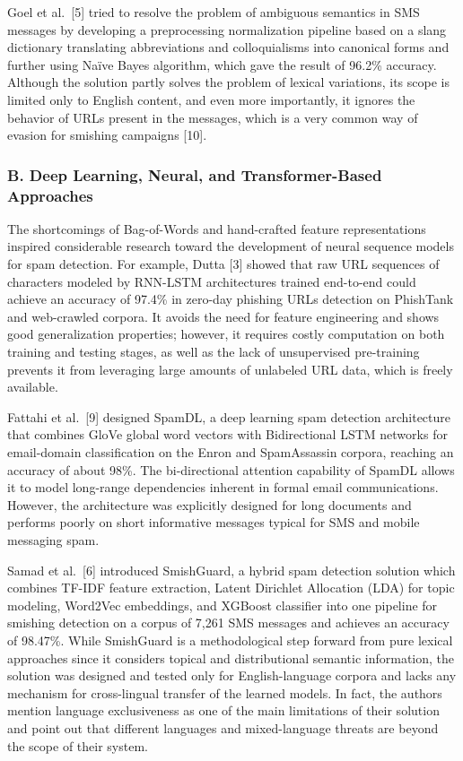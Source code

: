 Goel et al.~{[}5{]} tried to resolve the problem of ambiguous semantics
in SMS messages by developing a preprocessing normalization pipeline
based on a slang dictionary translating abbreviations and colloquialisms
into canonical forms and further using Naïve Bayes algorithm, which gave
the result of 96.2\% accuracy. Although the solution partly solves the
problem of lexical variations, its scope is limited only to English
content, and even more importantly, it ignores the behavior of URLs
present in the messages, which is a very common way of evasion for
smishing campaigns {[}10{]}.

\subsubsection{B. Deep Learning, Neural, and Transformer-Based
Approaches}\label{b.-deep-learning-neural-and-transformer-based-approaches}

The shortcomings of Bag-of-Words and hand-crafted feature
representations inspired considerable research toward the development of
neural sequence models for spam detection. For example, Dutta {[}3{]}
showed that raw URL sequences of characters modeled by RNN-LSTM
architectures trained end-to-end could achieve an accuracy of 97.4\% in
zero-day phishing URLs detection on PhishTank and web-crawled corpora.
It avoids the need for feature engineering and shows good generalization
properties; however, it requires costly computation on both training and
testing stages, as well as the lack of unsupervised pre-training
prevents it from leveraging large amounts of unlabeled URL data, which
is freely available.

Fattahi et al.~{[}9{]} designed SpamDL, a deep learning spam detection
architecture that combines GloVe global word vectors with Bidirectional
LSTM networks for email-domain classification on the Enron and
SpamAssassin corpora, reaching an accuracy of about 98\%. The
bi-directional attention capability of SpamDL allows it to model
long-range dependencies inherent in formal email communications.
However, the architecture was explicitly designed for long documents and
performs poorly on short informative messages typical for SMS and mobile
messaging spam.

Samad et al.~{[}6{]} introduced SmishGuard, a hybrid spam detection
solution which combines TF-IDF feature extraction, Latent Dirichlet
Allocation (LDA) for topic modeling, Word2Vec embeddings, and XGBoost
classifier into one pipeline for smishing detection on a corpus of 7,261
SMS messages and achieves an accuracy of 98.47\%. While SmishGuard is a
methodological step forward from pure lexical approaches since it
considers topical and distributional semantic information, the solution
was designed and tested only for English-language corpora and lacks any
mechanism for cross-lingual transfer of the learned models. In fact, the
authors mention language exclusiveness as one of the main limitations of
their solution and point out that different languages and mixed-language
threats are beyond the scope of their system.

